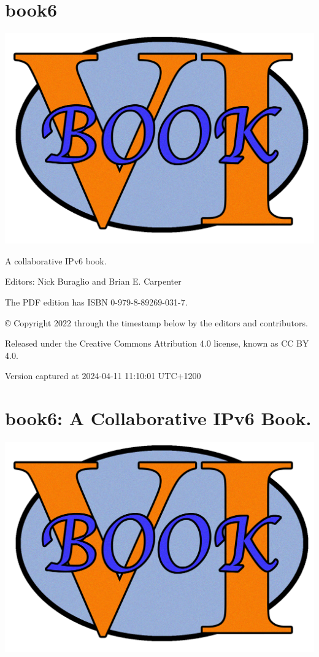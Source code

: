 \documentclass[
]{article}
\author{}
\date{}
\begin{document}
\section{book6}\label{book6}

\includegraphics{book6logo.png}

A collaborative IPv6 book.

Editors: Nick Buraglio and Brian E. Carpenter

The PDF edition has ISBN 0-979-8-89269-031-7.

© Copyright 2022 through the timestamp below by the editors and
contributors.

Released under the Creative Commons Attribution 4.0 license, known as CC
BY 4.0.

Version captured at 2024-04-11 11:10:01 UTC+1200

\pagebreak

\section{book6: A Collaborative IPv6
Book.}\label{book6-a-collaborative-ipv6-book}

\includegraphics{book6logo.png}
\end{document}
